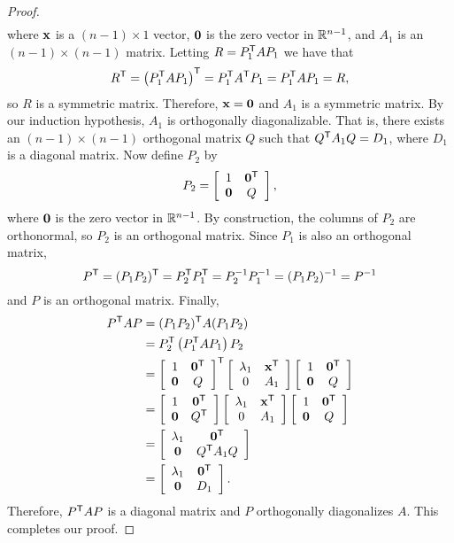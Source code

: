 \begin{proof}
\begin{align*}
\end{align*}
where $\mathbf{x}$ is a $(n-1)\times 1$ vector, $\mathbf{0}$ is the zero vector in $\mathbb{R}^{n-1}$, and $A_1$ is an $(n-1) \times (n-1)$ matrix. Letting $R = P_1^{\mathsf{T}}AP_1$ we have that 
\[R^{\mathsf{T}} = \left(P_1^{\mathsf{T}}AP_1\right)^{\mathsf{T}} = P_1^{\mathsf{T}}A^{\mathsf{T}}P_1 = P_1^{\mathsf{T}}AP_1 = R,\]
so $R$ is a symmetric matrix. Therefore, $\mathbf{x} = \mathbf{0}$ and $A_1$ is a symmetric matrix. By our induction hypothesis, $A_1$ is orthogonally diagonalizable. That is, there exists an $(n-1) \times (n-1)$ orthogonal matrix $Q$ such that $Q^{\mathsf{T}}A_1Q = D_1$, where $D_1$ is a diagonal matrix. Now define $P_2$ by 
\[P_2 = \left[ \begin{array}{cc} 1&\mathbf{0}^{\mathsf{T}} \\ \mathbf{0} & Q \end{array} \right],\]
where $\mathbf{0}$ is the zero vector in $\mathbb{R}^{n-1}$. By construction, the columns of $P_2$ are orthonormal, so $P_2$ is an orthogonal matrix. Since $P_1$ is also an orthogonal matrix, 
\[P^{\mathsf{T}} = (P_1P_2)^{\mathsf{T}} = P_2^{\mathsf{T}}P_1^{\mathsf{T}} = P_2^{-1}P_1^{-1} = (P_1P_2)^{-1}  = P^{-1}\]
and $P$ is an orthogonal matrix. Finally, 
\begin{align*}
P^{\mathsf{T}}AP &= (P_1P_2)^{\mathsf{T}}A(P_1P_2) \\
	&= P_2^{\mathsf{T}}\left(P_1^{\mathsf{T}}AP_1\right)P_2 \\
	&= \left[ \begin{array}{cc} 1&\mathbf{0}^{\mathsf{T}} \\ \mathbf{0} & Q \end{array} \right]^{\mathsf{T}} \left[ \begin{array}{cc} \lambda_1&\mathbf{x}^{\mathsf{T}} \\ 0 & A_1 \end{array} \right] \left[ \begin{array}{cc} 1&\mathbf{0}^{\mathsf{T}} \\ \mathbf{0} & Q \end{array} \right] \\
	&= \left[ \begin{array}{cc} 1&\mathbf{0}^{\mathsf{T}} \\ \mathbf{0} & Q^{\mathsf{T}} \end{array} \right] \left[ \begin{array}{cc} \lambda_1&\mathbf{x}^{\mathsf{T}} \\ 0 & A_1 \end{array} \right]\left[ \begin{array}{cc} 1&\mathbf{0}^{\mathsf{T}} \\ \mathbf{0} & Q \end{array} \right] \\
	&= \left[ \begin{array}{cc} \lambda_1&\mathbf{0}^{\mathsf{T}} \\ \mathbf{0} & Q^{\mathsf{T}}A_1Q \end{array} \right] \\
	&= \left[ \begin{array}{cc} \lambda_1&\mathbf{0}^{\mathsf{T}} \\ \mathbf{0} & D_1 \end{array} \right].
\end{align*}
Therefore, $P^{\mathsf{T}}AP$ is a diagonal matrix and $P$ orthogonally diagonalizes $A$. This completes our proof.
\end{proof}
